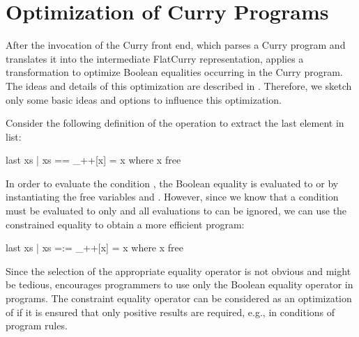 \section{Optimization of Curry Programs}

After the invocation of the Curry front end,
which parses a Curry program and translates it into the intermediate FlatCurry
representation, \CYS applies a transformation
to optimize Boolean equalities occurring in the Curry program.
The ideas and details of this optimization are described
in \cite{AntoyHanus15LOPSTR}.
Therefore, we sketch only some basic ideas and options
to influence this optimization.

Consider the following definition of the operation 
to extract the last element in list:
%
\begin{curry}
last xs | xs == _++[x]
        = x
 where x free
\end{curry}
%
In order to evaluate the condition ,
the Boolean equality is evaluated to  or 
by instantiating the free variables \code{\us} and .
However, since we know that a condition must be evaluated to
 only and all evaluations to  can be ignored,
we can use the constrained equality to obtain a more efficient program:
%
\begin{curry}
last xs | xs =:= _++[x]
        = x
 where x free
\end{curry}
%
Since the selection of the appropriate equality operator
is not obvious and might be tedious, \CYS encourages
programmers to use only the Boolean equality operator \ccode{==}
in programs.
The constraint equality operator \ccode{=:=} can be considered
as an optimization of \ccode{==} if it is ensured that only
positive results are required, e.g., in conditions of program rules.

